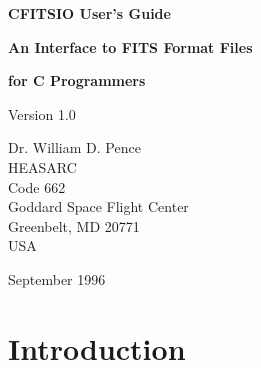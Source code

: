 %
\oddsidemargin=0.25in
\evensidemargin=0.00in
\textwidth=6.0in
\topmargin=0.0in
\textheight=8.75in
\parindent=0cm
\parskip=0.2cm


\begin{titlepage}
\normalsize
\vspace*{4.0cm}
\begin{center}
{\Huge \bf CFITSIO User's Guide}\\
\end{center}
\medskip 
\medskip 
\begin{center}
{\LARGE \bf An Interface to FITS Format Files}\\
\end{center}
\begin{center}
{\LARGE \bf for C Programmers}\\
\end{center}
\medskip
\medskip
\begin{center}
{\Large Version 1.0\\}
\end{center}
\bigskip
\vskip 3.0cm
\begin{center}
{Dr. William D. Pence\\
HEASARC\\
Code 662\\
Goddard Space Flight Center\\
Greenbelt, MD 20771\\
USA}
\end{center}

\vfill
\bigskip
\begin{center}
{\Large September 1996\\}
\end{center}
\vfill
\end{titlepage}

\begin{titlepage}
\vspace*{7.6cm}
\vfill
\end{titlepage}


\tableofcontents

\chapter{Introduction }

